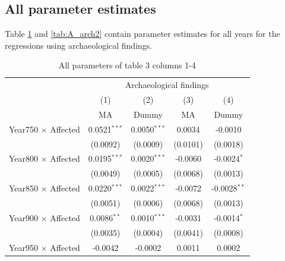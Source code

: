 \newpage
\subsection{All parameter estimates} \label{all_arch_param}
Table \ref{tab:A_arch1} and \ref{tab:A_arch2} contain parameter estimates for all years for the regressions using archaeological findings. 

\begin{table}[H]
\centering
\footnotesize
\caption{All parameters of table 3 columns 1-4} \label{tab:A_arch1}
\begin{tabular}{lcccc}
   \tabularnewline \midrule \midrule
                                                    & \multicolumn{4}{c}{Archaeological findings}\\
                                                    & (1)             & (2)             & (3)                   & (4)\\  
                                                    & MA              & Dummy           & MA                    & Dummy\\
   \midrule
   Year750 $\times$ Affected                        & 0.0521$^{***}$  & 0.0050$^{***}$  & 0.0034                & -0.0010\\   
                                                    & (0.0092)        & (0.0009)        & (0.0101)              & (0.0018)\\   
   Year800 $\times$ Affected                        & 0.0195$^{***}$  & 0.0020$^{***}$  & -0.0060               & -0.0024$^{*}$\\   
                                                    & (0.0049)        & (0.0005)        & (0.0068)              & (0.0013)\\   
   Year850 $\times$ Affected                        & 0.0220$^{***}$  & 0.0022$^{***}$  & -0.0072               & -0.0028$^{**}$\\   
                                                    & (0.0051)        & (0.0006)        & (0.0068)              & (0.0013)\\   
   Year900 $\times$ Affected                        & 0.0086$^{**}$   & 0.0010$^{***}$  & -0.0031               & -0.0014$^{*}$\\   
                                                    & (0.0035)        & (0.0004)        & (0.0041)              & (0.0008)\\   
   Year950 $\times$ Affected                        & -0.0042         & -0.0002         & 0.0011                & 0.0002\\   

\end{tabular}
\end{table}
